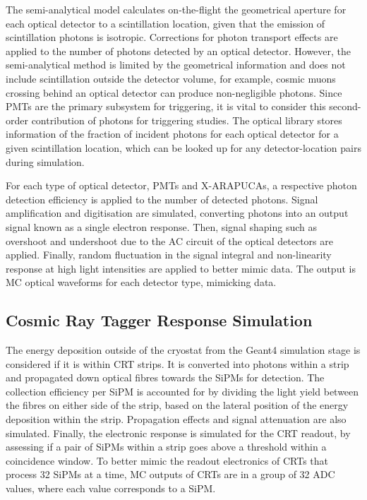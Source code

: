 The semi-analytical model calculates on-the-flight the geometrical aperture for each optical detector to a scintillation location, given that the emission of scintillation photons is isotropic.
Corrections for photon transport effects are applied to the number of photons detected by an optical detector.
However, the semi-analytical method is limited by the geometrical information and does not include scintillation outside the detector volume, for example, cosmic muons crossing behind an optical detector can produce non-negligible photons.
Since PMTs are the primary subsystem for triggering, it is vital to consider this second-order contribution of photons for triggering studies.
The optical library stores information of the fraction of incident photons for each optical detector for a given scintillation location, which can be looked up for any detector-location pairs during 
simulation. 

For each type of optical detector, PMTs and X-ARAPUCAs, a respective photon detection efficiency is applied to the number of detected photons.
Signal amplification and digitisation are simulated, converting photons into an output signal known as a single electron response.
Then, signal shaping such as overshoot and undershoot due to the AC circuit of the optical detectors are applied.
Finally, random fluctuation in the signal integral and non-linearity response at high light intensities are applied to better mimic data.
The output is MC optical waveforms for each detector type, mimicking data. 

\subsection{Cosmic Ray Tagger Response Simulation}
\label{sec:crt_response}

The energy deposition outside of the cryostat from the Geant4 simulation stage is considered if it is within CRT strips.
It is converted into photons within a strip and propagated down optical fibres towards the SiPMs for detection.
The collection efficiency per SiPM is accounted for by dividing the light yield between the fibres on either side of the strip, based on the lateral position of the energy deposition within the strip.
Propagation effects and signal attenuation are also simulated.
Finally, the electronic response is simulated for the CRT readout, by assessing if a pair of SiPMs within a strip goes above a threshold within a coincidence window.
To better mimic the readout electronics of CRTs that process 32 SiPMs at a time, MC outputs of CRTs are in a group of 32 ADC values, where each value corresponds to a SiPM.

